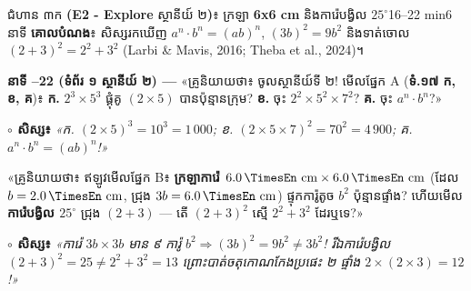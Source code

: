 \documentclass[a4paper,12pt]{article}
\newcommand{\en}[1]{{\TimesEn #1}}
\newcommand{\enbf}[1]{{\TimesEn\textbf{#1}}}
\newcommand{\unit}[1]{\,\text{\en{#1}}}
\newcommand{\teachersays}[1]{{\muol\fontsize{10.8pt}{17pt}\selectfont «គ្រូនិយាយថា៖} #1»}
\begin{document}
\Needspace{2.0cm}
\begin{phasebox}{ជំហាន ៣ក \enbf{(E2 - Explore} ស្ថានីយ៍ ២\enbf{)}៖ ក្រឡា \enbf{6x6 cm} និងការ៉េបង្វិល $25^\circ$}{16--22 min}{6 នាទី}
\textbf{គោលបំណង}៖ សិស្សរកឃើញ $a^n\cdot b^n = (ab)^n$, $(3b)^2 = 9b^2$ និងទាត់ចោល $(2+3)^2 = 2^2+3^2$ \en{(Larbi \& Mavis, 2016; Theba et al., 2024)}។
\end{phasebox}
\begin{scriptbox}
  \textbf{នាទី \en{16--22} (ទំព័រ ១ ស្ថានីយ៍ ២) — }\teachersays{ចូលស្ថានីយ៍ទី ២! មើលផ្នែក \en{A} (\textbf{ទំ.១៧ ក, ខ, គ})៖ \textbf{ក.} $2^3\times 5^3$ ផ្គុំគូ $(2\times 5)$ បានប៉ុន្មានក្រុម? \textbf{ខ.} ចុះ $2^2\times 5^2\times 7^2$? \textbf{គ.} ចុះ $a^n\cdot b^n$?}\par\vspace{2pt}
  \textbf{$\circ$ សិស្ស៖} \textit{«ក. $(2\times 5)^3 = 10^3 = 1\,000$; ខ. $(2\times 5\times 7)^2 = 70^2 = 4\,900$; គ. $a^n\cdot b^n = (ab)^n$!»}\par\vspace{3pt}
  \teachersays{ឥឡូវមើលផ្នែក \en{B}៖ \textbf{ក្រឡាការ៉េ $6.0\unit{cm}\times 6.0\unit{cm}$} (ដែល $b=2.0\unit{cm}$, ជ្រុង $3b=6.0\unit{cm}$) ផ្ទុកការ៉ូតូច $b^2$ ប៉ុន្មានផ្ទាំង? ហើយមើល \textbf{ការ៉េបង្វិល $25^\circ$} ជ្រុង $(2+3)$ — តើ $(2+3)^2$ ស្មើ $2^2+3^2$ ដែរឬទេ?}\par\vspace{2pt}
  \textbf{$\circ$ សិស្ស៖} \textit{«ការ៉េ $3b\times 3b$ មាន ៩ ការ៉ូ $b^2 \Rightarrow (3b)^2 = 9b^2 \neq 3b^2$! រីឯការ៉េបង្វិល $(2+3)^2 = 25 \neq 2^2+3^2 = 13$ ព្រោះបាត់ចតុកោណកែងប្រផេះ ២ ផ្ទាំង $2\times(2\times 3)=12$!»}
\end{scriptbox}
\end{document}
